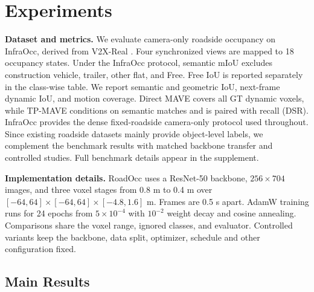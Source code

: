 \documentclass{article}
\begin{document}
\section{Experiments}
\label{sec:experiments}


\noindent\textbf{Dataset and metrics.}
We evaluate camera-only roadside occupancy on InfraOcc, derived from V2X-Real
\citep{V2XReal,InfraOcc}. Four synchronized views are mapped to 18 occupancy
states. Under the InfraOcc protocol, semantic mIoU excludes construction
vehicle, trailer, other flat, and Free. Free IoU is reported separately in the
class-wise table. We report semantic and geometric IoU, next-frame dynamic IoU,
and motion coverage. Direct MAVE covers all GT dynamic voxels, while TP-MAVE
conditions on semantic matches and is paired with recall (DSR).
InfraOcc provides the dense fixed-roadside camera-only protocol used throughout.
Since existing roadside datasets mainly provide object-level labels, we
complement the benchmark results with matched backbone transfer and controlled
studies. Full benchmark details appear in the supplement.

\noindent\textbf{Implementation details.}
RoadOcc uses a ResNet-50 backbone, $256\times704$ images, and three voxel stages
from 0.8 m to 0.4 m over $[-64,64]\times[-64,64]\times[-4.8,1.6]$ m. Frames are
0.5 s apart. AdamW training runs for 24 epochs from $5\times10^{-4}$ with
$10^{-2}$ weight decay and cosine annealing. Comparisons share the voxel range,
ignored classes, and evaluator. Controlled variants keep the
backbone, data split, optimizer, schedule and other
configuration fixed.


\subsection{Main Results}
\label{sec:main_results}


\end{document}
